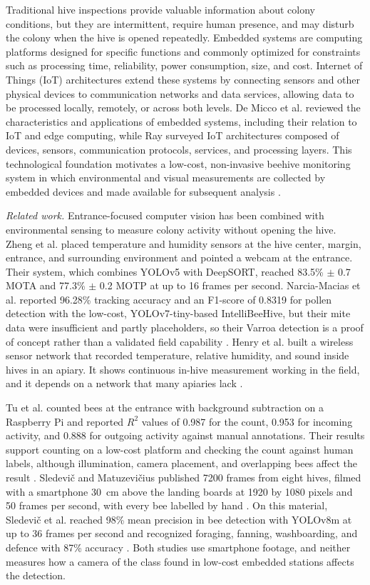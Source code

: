 \documentclass[english,hidelinks]{sbrt}
\begin{document}
Traditional hive inspections provide valuable information about colony conditions, but they are intermittent, require human presence, and may disturb the colony when the hive is opened repeatedly. Embedded systems are computing platforms designed for specific functions and commonly optimized for constraints such as processing time, reliability, power consumption, size, and cost. Internet of Things (IoT) architectures extend these systems by connecting sensors and other physical devices to communication networks and data services, allowing data to be processed locally, remotely, or across both levels. De Micco et al. reviewed the characteristics and applications of embedded systems, including their relation to IoT and edge computing, while Ray surveyed IoT architectures composed of devices, sensors, communication protocols, services, and processing layers. This technological foundation motivates a low-cost, non-invasive beehive monitoring system in which environmental and visual measurements are collected by embedded devices and made available for subsequent analysis \cite{demicco2020embedded,ray2018iotarchitectures}.

\textit{Related work.} Entrance-focused computer vision has been combined with environmental sensing to measure colony activity without opening the hive. Zheng et al. placed temperature and humidity sensors at the hive center, margin, entrance, and surrounding environment and pointed a webcam at the entrance. Their system, which combines YOLOv5 with DeepSORT, reached 83.5\% $\pm$ 0.7 MOTA and 77.3\% $\pm$ 0.2 MOTP at up to 16 frames per second. Narcia-Macias et al. reported 96.28\% tracking accuracy and an F1-score of 0.8319 for pollen detection with the low-cost, YOLOv7-tiny-based IntelliBeeHive, but their mite data were insufficient and partly placeholders, so their Varroa detection is a proof of concept rather than a validated field capability \cite{zheng2024intelligent,narciamacias2024intellibeehive}. Henry et al. built a wireless sensor network that recorded temperature, relative humidity, and sound inside hives in an apiary. It shows continuous in-hive measurement working in the field, and it depends on a network that many apiaries lack \cite{henry2019precision}.

Tu et al. counted bees at the entrance with background subtraction on a Raspberry Pi and reported $R^2$ values of 0.987 for the count, 0.953 for incoming activity, and 0.888 for outgoing activity against manual annotations. Their results support counting on a low-cost platform and checking the count against human labels, although illumination, camera placement, and overlapping bees affect the result \cite{tu2016automatic}. Sledevi\v{c} and Matuzevi\v{c}ius published 7200 frames from eight hives, filmed with a smartphone 30~cm above the landing boards at 1920 by 1080 pixels and 50 frames per second, with every bee labelled by hand \cite{sledevic2024dataset}. On this material, Sledevi\v{c} et al. reached 98\% mean precision in bee detection with YOLOv8m at up to 36 frames per second and recognized foraging, fanning, washboarding, and defence with 87\% accuracy \cite{sledevic2025behavior}. Both studies use smartphone footage, and neither measures how a camera of the class found in low-cost embedded stations affects the detection.
\end{document}
